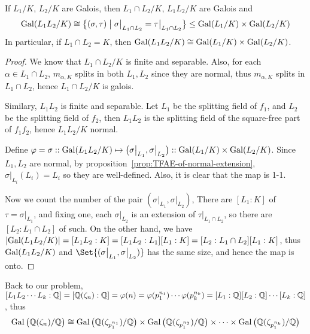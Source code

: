 \begin{lemma}
  If $L_1 / K$, $L_2 / K$ are Galois, then $L_1 \cap L_2 / K$, $L_1 L_2 / K$ are Galois and
  \[ \operatorname{Gal}( L_1 L_2 / K) \cong \big\{ (\sigma, \tau) \bigm| \sigma\big|_{L_1 \cap L_2} = \tau\big|_{L_1 \cap L_2} \big\}
    \leq \operatorname{Gal}(L_1 / K) \times \operatorname{Gal}(L_2 / K) \]
  In particular, if $L_1 \cap L_2 = K$, then $\operatorname{Gal}(L_1 L_2 / K) \cong \operatorname{Gal}(L_1 / K) \times \operatorname{Gal}(L_2 / K)$.

  \begin{proof}
    We know that $L_1 \cap L_2 / K$ is finite and separable. Also, for each $\alpha \in L_1 \cap L_2$,
    $m_{\alpha, K}$ splits in both $L_1, L_2$ since they are normal, thus $m_{\alpha, K}$ splits
    in $L_1 \cap L_2$, hence $L_1 \cap L_2 / K$ is galois.

    Similary, $L_1 L_2$ is finite and separable. Let $L_1$ be the splitting field of $f_1$,
    and $L_2$ be the splitting field of $f_2$, then $L_1 L_2$ is the splitting field
    of the square-free part of $f_1 f_2$, hence $L_1 L_2 / K$ normal.

    Define $\varphi = \sigma :: \operatorname{Gal}(L_1 L_2 / K) \mapsto \big( \sigma \big|_{L_1}, \sigma \big|_{L_2} \big)
    :: \operatorname{Gal}(L_1 / K) \times \operatorname{Gal}(L_2 / K)$. Since $L_1, L_2$ are normal,
    by proposition~\ref{prop:TFAE-of-normal-extension}, $\sigma \big|_{L_i}(L_i) = L_i$ so they are well-defined.
    Also, it is clear that the map is 1-1.

    Now we count the number of the pair $(\sigma \big|_{L_1}, \sigma \big|_{L_2})$,
    There are $[L_1: K]$ of $\tau = \sigma \big|_{L_1}$, and fixing one, each $\sigma \big|_{L_2}$
    is an extension of $\tau \big|_{L_1 \cap L_2}$, so there are $[L_2 : L_1 \cap L_2]$ of such.
    On the other hand, we have $\lvert\operatorname{Gal}(L_1 L_2 / K)\rvert = [L_1 L_2 : K] = [L_1 L_2 : L_1]
    [L_1 : K] = [L_2 : L_1 \cap L_2] [L_1 : K]$, thus $\operatorname{Gal}(L_1 L_2 / K)$ and
    $\Set{(\sigma \big|_{L_1}, \sigma \big|_{L_2})}$ has the same size, and hence the
    map is onto.
  \end{proof}
\end{lemma}

Back to our problem, $[L_1 L_2 \cdots L_k: \mathbb{Q}] = [\mathbb{Q}(\zeta_n): \mathbb{Q}] = \varphi(n) = \varphi(p_1^{n_1})
\cdots \varphi(p_k^{n_k}) = [L_1 : \mathbb{Q}] [L_2 : \mathbb{Q}] \cdots [L_k : \mathbb{Q}]$, thus
\[ \operatorname{Gal}\big( \mathbb{Q}(\zeta_n) / \mathbb{Q} \big) \cong
  \operatorname{Gal}\big( \mathbb{Q}(\zeta_{p_1^{n_1}}) / \mathbb{Q} \big) \times
  \operatorname{Gal}\big( \mathbb{Q}(\zeta_{p_1^{n_2}}) / \mathbb{Q} \big) \times \cdots \times
  \operatorname{Gal}\big( \mathbb{Q}(\zeta_{p_1^{n_k}}) / \mathbb{Q} \big) \]

